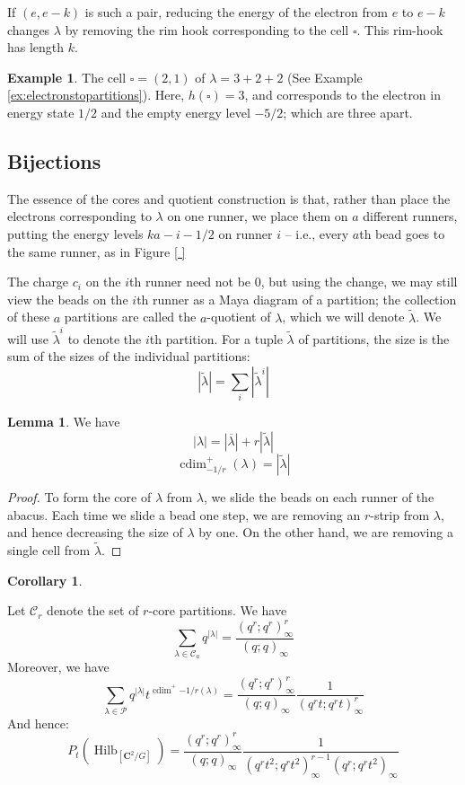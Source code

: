 \documentclass{amsart}[12pt]
\theoremstyle{definition}
\newtheorem{lemma}[dummy]{Lemma}
\newtheorem{example}[dummy]{Example}
\newtheorem{corollary}[dummy]{Corollary}
\newcommand{\C}{\mathbf{C}}
\DeclareMathOperator{\Hilb}{Hilb}
\DeclareMathOperator{\cdim}{cdim}
\begin{document}
If $(e,e-k)$ is such a pair, reducing the energy of the electron from
$e$ to $e-k$ changes $\lambda$ by removing the
rim hook corresponding to the cell $\square$.  This rim-hook has
length $k$.



\begin{example}
The cell $\square=(2,1)$ of $\lambda=3+2+2$ (See Example \ref{ex:electronstopartitions}).
Here, $h(\square)=3$, and corresponds to the electron in energy state $1/2$
and the empty energy level $-5/2$; which are three apart.

\end{example}

\subsection{Bijections}

The essence of the cores and quotient construction is that, rather than place the electrons corresponding to $\lambda$ on one runner, we place them on $a$ different runners, putting the energy levels $ka-i-1/2$ on runner $i$ -- i.e., every $a$th bead goes to the same runner, as in Figure \ref{ }

The charge $c_i$ on the $i$th runner need not be 0, but using the change, we may still view the beads on the $i$th runner as a Maya diagram of a partition; the collection of these $a$ partitions are called the $a$-quotient of $\lambda$, which we will denote $\tilde{\lambda}$.  We will use $\tilde{\lambda}^i$ to denote the $i$th partition.  For a tuple $\tilde{\lambda}$ of partitions, the size is the sum of the sizes of the individual partitions: 
$$|\tilde{\lambda}|=\sum_i |\tilde{\lambda}^i|$$

\begin{lemma}
We have
$$|\lambda|=|\overline{\lambda}|+r|\tilde{\lambda}|$$
$$\cdim^+_{-1/r}(\lambda)=|\tilde{\lambda}|$$
\end{lemma}

\begin{proof}
To form the core of $\lambda$ from $\lambda$, we slide the beads on each runner of the abacus.  Each time we slide a bead one step, we are removing an $r$-strip from $\lambda$, and hence decreasing the size of $\lambda$ by one.  On the other hand, we are removing a single cell from $\tilde{\lambda}$.


\end{proof}


\begin{corollary} \label{cor:product-formulas-traditional-cores}

Let $\mathcal{C}_r$ denote the set of $r$-core partitions.  We have
$$\sum_{\lambda\in\mathcal{C}_a} q^{|\lambda|}=\frac{(q^r;q^r)_\infty^r}{(q;q)_\infty}$$
Moreover, we have 
$$\sum_{\lambda\in\mathcal{P}} q^{|\lambda|} t^{\cdim^+{-1/r}(\lambda)}=\frac{(q^r;q^r)_\infty^r}{(q;q)_\infty}\frac{1}{(q^rt;q^rt)_\infty^r}$$
And hence:
$$P_t(\Hilb_{[\C^2/G]})=\frac{(q^r;q^r)_\infty^r}{(q;q)_\infty}\frac{1}{(q^rt^2;q^rt^2)_\infty^{r-1}(q^r;q^rt^2)_\infty}$$
\end{corollary}
\end{document}
